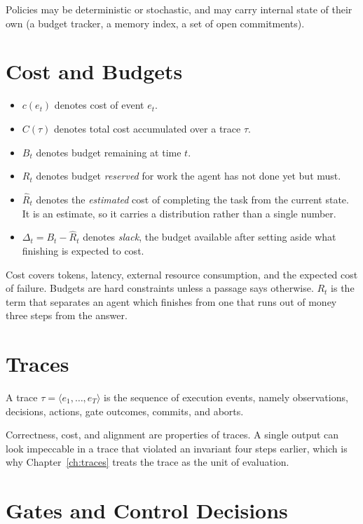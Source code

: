 \documentclass[11pt]{book}
\begin{document}
Policies may be deterministic or stochastic, and may carry internal state of
their own (a budget tracker, a memory index, a set of open commitments).

\section*{Cost and Budgets}

\begin{itemize}
\item $c(e_t)$ denotes cost of event $e_t$.
\item $C(\tau)$ denotes total cost accumulated over a trace $\tau$.
\item $B_t$ denotes budget remaining at time $t$.
\item $R_t$ denotes budget \emph{reserved} for work the agent has not done yet but must.
\item $\hat{R}_t$ denotes the \emph{estimated} cost of completing the task from the
current state. It is an estimate, so it carries a distribution rather than a single number.
\item $\Delta_t = B_t - \hat{R}_t$ denotes \emph{slack}, the budget available after
setting aside what finishing is expected to cost.
\end{itemize}

Cost covers tokens, latency, external resource consumption, and the expected
cost of failure. Budgets are hard constraints unless a passage says otherwise.
$R_t$ is the term that separates an agent which finishes from one that runs out
of money three steps from the answer.

\section*{Traces}

A trace $\tau = \langle e_1, \ldots, e_T \rangle$ is the sequence of execution
events, namely observations, decisions, actions, gate outcomes, commits, and aborts.

Correctness, cost, and alignment are properties of traces. A single output can
look impeccable in a trace that violated an invariant four steps earlier, which
is why Chapter~\ref{ch:traces} treats the trace as the unit of evaluation.

\section*{Gates and Control Decisions}
\end{document}
